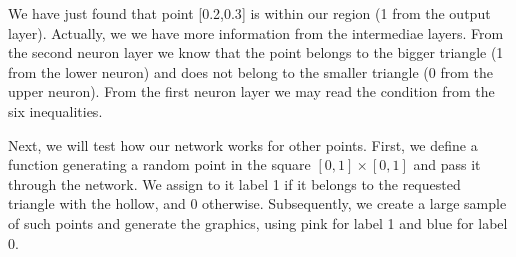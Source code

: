 \documentclass[letterpaper,10pt,english]{jupyterBook}
\begin{document}
\noindent{}

\sphinxAtStartPar
We have just found that point {[}0.2,0.3{]} is within our region (1 from the output layer). Actually, we we have more information from the intermediae layers. From the second neuron layer we know that the point belongs to the bigger triangle (1 from the lower neuron) and does not belong to the smaller triangle (0 from the upper neuron). From the first neuron layer we may read the condition from the six inequalities.

\sphinxAtStartPar
Next, we will test how our network works for other points. First, we define a function generating a  random point in the square \([0,1]\times [0,1]\) and pass it through the network. We assign to it label 1 if it belongs to the requested triangle with the hollow, and 0 otherwise. Subsequently, we create a large sample of such points and generate the graphics, using pink for label 1 and blue for label 0.

\begin{sphinxVerbatim}[commandchars=\\\{\}]
 
    \PYG{p}{[}\PYG{p}{]} 
                 
     \PYG{p}{[}\PYG{p}{[}\PYG{p}{]}\PYG{p}{[}\PYG{p}{]}\PYG{p}{[}\PYG{p}{]}\PYG{p}{[}\PYG{p}{]}\PYG{p}{]}               
\end{sphinxVerbatim}

\begin{sphinxVerbatim}[commandchars=\\\{\}]
\PYG{p}{[}    \PYG{p}{]}
\PYG{p}{[}\PYG{p}{]}
\end{sphinxVerbatim}
\end{document}
